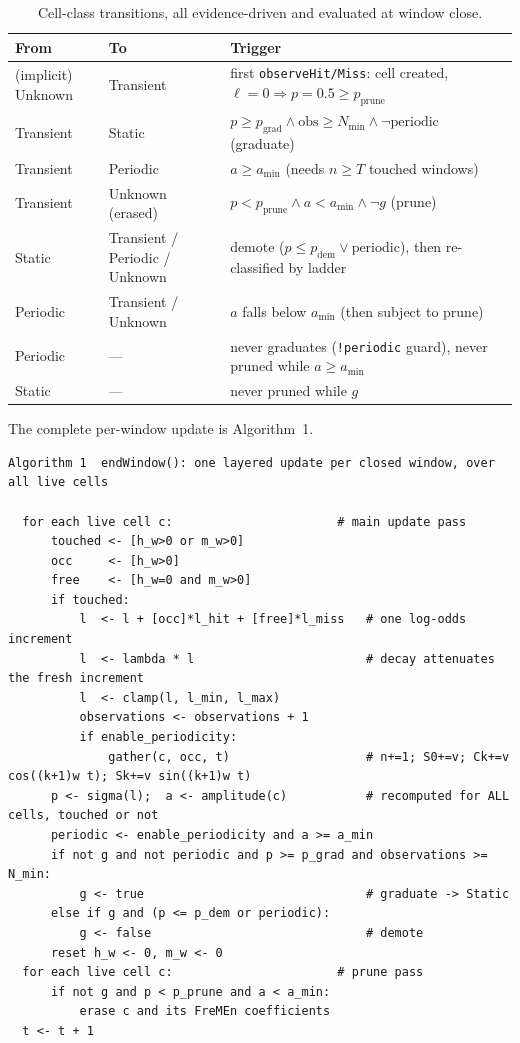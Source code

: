 \documentclass[conference]{IEEEtran}
\begin{document}
\begin{table}[t]
\centering
\caption{Cell-class transitions, all evidence-driven and evaluated at window close.}
\label{tbl:states}
\begin{tabular}{@{}lll@{}}
\toprule
From & To & Trigger \\
\midrule
(implicit) Unknown & Transient & first \texttt{observeHit/Miss}: cell created, $\ell{=}0\Rightarrow p{=}0.5\ge p_{\text{prune}}$ \\
Transient & Static & $p\ge p_{\text{grad}}\land\text{obs}\ge N_{\min}\land\lnot\text{periodic}$ (graduate) \\
Transient & Periodic & $a\ge a_{\min}$ (needs $n\ge T$ touched windows) \\
Transient & Unknown (erased) & $p<p_{\text{prune}}\land a<a_{\min}\land\lnot g$ (prune) \\
Static & Transient / Periodic / Unknown & demote ($p\le p_{\text{dem}}\lor\text{periodic}$), then re-classified by ladder \\
Periodic & Transient / Unknown & $a$ falls below $a_{\min}$ (then subject to prune) \\
Periodic & --- & never graduates (\texttt{!periodic} guard), never pruned while $a\ge a_{\min}$ \\
Static & --- & never pruned while $g$ \\
\bottomrule
\end{tabular}
\end{table}

The complete per-window update is Algorithm~1.

\begin{lstlisting}
Algorithm 1  endWindow(): one layered update per closed window, over all live cells

  for each live cell c:                       # main update pass
      touched <- [h_w>0 or m_w>0]
      occ     <- [h_w>0]
      free    <- [h_w=0 and m_w>0]
      if touched:
          l  <- l + [occ]*l_hit + [free]*l_miss   # one log-odds increment
          l  <- lambda * l                        # decay attenuates the fresh increment
          l  <- clamp(l, l_min, l_max)
          observations <- observations + 1
          if enable_periodicity:
              gather(c, occ, t)                   # n+=1; S0+=v; Ck+=v cos((k+1)w t); Sk+=v sin((k+1)w t)
      p <- sigma(l);  a <- amplitude(c)           # recomputed for ALL cells, touched or not
      periodic <- enable_periodicity and a >= a_min
      if not g and not periodic and p >= p_grad and observations >= N_min:
          g <- true                               # graduate -> Static
      else if g and (p <= p_dem or periodic):
          g <- false                              # demote
      reset h_w <- 0, m_w <- 0
  for each live cell c:                       # prune pass
      if not g and p < p_prune and a < a_min:
          erase c and its FreMEn coefficients
  t <- t + 1
\end{lstlisting}
\end{document}
